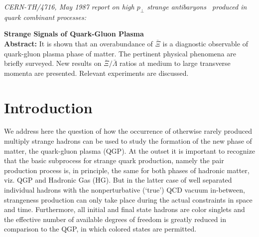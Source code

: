 \noindent\textit{%
CERN-TH/4716, May 1987 report on high $p_\bot$ strange antibaryons~\cite{Rafelski:1987bx} produced in quark combinant processes:}\\[-0.7cm]
%
\begin{mdframed}[linecolor=gray,roundcorner=12pt,backgroundcolor=Dandelion!15,linewidth=1pt,leftmargin=0cm,rightmargin=0cm,topline=true,bottomline=true,skipabove=12pt]\relax%
%
{\Large {\bf Strange Signals of Quark-Gluon Plasma}}\\[0.4cm]
\textbf{Abstract:} It is shown that an overabundance of $\bar\Xi$ is a diagnostic observable of quark-gluon plasma phase of matter. The pertinent physical phenomena are briefly surveyed. New results on $\bar\Xi/\bar\Lambda$ ratios at medium to large transverse momenta are presented. Relevant experiments are discussed.
 
\section*{Introduction}

We address here the question of how the occurrence of otherwise rarely produced multiply strange hadrons can be used to study the formation of the new phase of matter, the quark-gluon plasma\footnotemark[1] (QGP). At the outset it is important to recognize that the basic subprocess for strange quark production, namely the pair production process is, in principle, the same for both phases of hadronic matter, viz. QGP and Hadronic Gas (HG). But in the latter case of well separated individual hadrons with the nonperturbative (\lq true\rq) QCD vacuum in-between, strangeness production can only take place during the actual constraints in space and time. Furthermore, all initial and final state hadrons are color singlets and the effective number of available degrees of freedom is greatly reduced in comparison to the QGP, in which colored states are permitted.


\end{mdframed}
